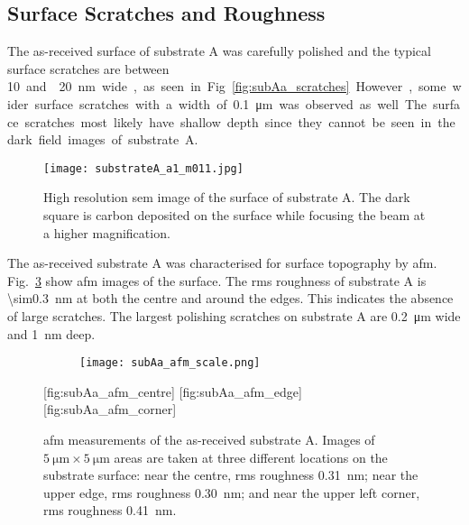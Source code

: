 \subsection{Surface Scratches and Roughness}
The as-received surface of substrate A was carefully polished and the typical surface scratches are between \SI{10} and {}\SI{20}{\nano\metre} wide, as seen in Fig.~\ref{fig:subAa_scratches}. However, some wider surface scratches with a width of \SI{0.1}{\micro\metre} was observed as well. The surface scratches most likely have shallow depth since they cannot be seen in the dark field images of substrate A.

\begin{figure}[htbp]
    \centering
    \texttt{[image: substrateA\_a1\_m011.jpg]}
    \caption[\Ac{sem} image of surface scratches on substrate A.]{High resolution \acf{sem} image of the surface of substrate A. The dark square is carbon deposited on the surface while focusing the beam at a higher magnification.}\label{fig:subAa_scratches}
    \label{fig:SEM_A_surface}
\end{figure}

The as-received substrate A was characterised for surface topography by \ac{afm}. Fig.~\ref{fig:subAa_afm} show \ac{afm} images of the surface. The \ac{rms} roughness of substrate A is \SI{\sim0.3}{\nano\metre} at both the centre and around the edges. This indicates the absence of large scratches. The largest polishing scratches on substrate A are \SI{0.2}{\micro\metre} wide and \SI{1}{\nano\metre} deep.

\begin{figure}[htbp]
    \centering
    \begin{subfigure}[b]{0.032\linewidth}
        \label{fig:subAa_afm_scale}\captionsetup{list=no}
        \texttt{[image: subAa\_afm\_scale.png]}
    \end{subfigure}
    \hfill
    [fig:subAa_afm_centre]
    \hfill
    [fig:subAa_afm_edge]%
    \hfill
    [fig:subAa_afm_corner]%
    \caption[\Ac{afm} of as-received substrate A.]{\Acf{afm} measurements of the as-received substrate A. Images of $\SI{5}{\micro\metre}\times\SI{5}{\micro\metre}$ areas are taken at three different locations on the substrate surface:  near the centre, \ac{rms} roughness \SI{0.31}{\nano\metre};  near the upper edge, \ac{rms} roughness \SI{0.30}{\nano\metre}; and  near the upper left corner, \ac{rms} roughness \SI{0.41}{\nano\metre}.}\label{fig:subAa_afm}
\end{figure} %

